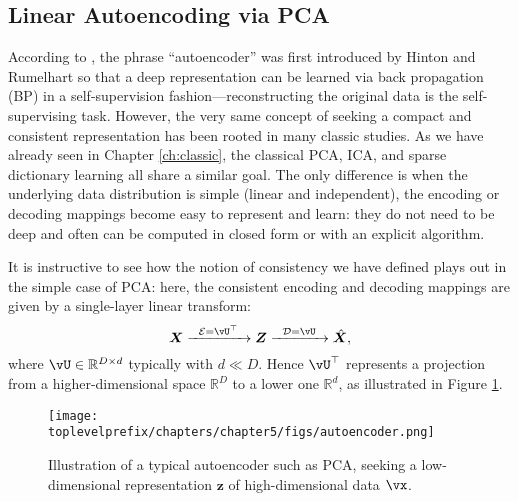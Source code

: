 \documentclass[../../book-main.tex]{subfiles}
\begin{document}
\subsection{Linear Autoencoding via PCA}
According to \cite{Baldi2011}, the phrase ``autoencoder'' was first
introduced by Hinton and Rumelhart \cite{Rumelhart1986} so that a
deep representation can be learned via back propagation (BP) in a self-supervision fashion---reconstructing the original data is the self-supervising task. However, the very same concept of seeking a compact and consistent representation has been rooted in many classic studies. As we have already seen in Chapter \ref{ch:classic}, the classical PCA, ICA, and sparse dictionary learning all share a similar goal. The only difference is when the underlying data distribution is simple (linear and
independent), the encoding or decoding mappings become easy to represent and
learn: they do not need to be deep and often can be computed in closed form or
with an explicit algorithm.

It is instructive to see how the notion of consistency we have
defined plays out in the simple case of PCA:
here, the consistent encoding and decoding mappings are given by a single-layer
linear transform:
\begin{equation}
  \X \xrightarrow{\hspace{2mm} \mathcal{E} = \vU^\top \hspace{2mm}}
  \Z \xrightarrow{\hspace{2mm} \mathcal{D} = \vU \hspace{2mm}}   \hat{\X},
  \label{eqn:autoencoding-PCA-2}
\end{equation}
where $\vU \in \mathbb{R}^{D\times d}$ typically with $d\ll D$. Hence
$\vU^\top $ represents a projection from a higher-dimensional space
$\mathbb{R}^{D}$  to a lower one $\mathbb{R}^{d}$, as illustrated in
Figure \ref{fig:AE}.
\begin{figure}
  \centering \texttt{[image: \\toplevelprefix/chapters/chapter5/figs/autoencoder.png]}
  \caption{Illustration of a typical autoencoder such as PCA, seeking
  a low-dimensional representation $\bm{z}$ of high-dimensional data $\vx$.}
  \label{fig:AE}
\end{figure}
\end{document}
